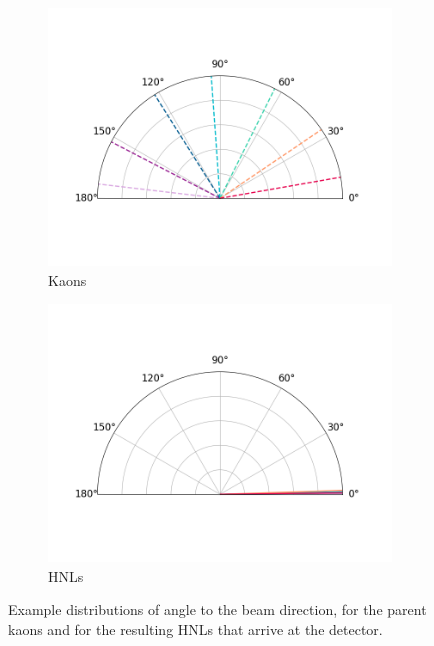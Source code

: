 \begin{figure}[tbp!]
        \centering
        \begin{subfigure}[b]{0.495\textwidth}
            \centering
            \includegraphics[width=\textwidth]{kaon_angle}
            \caption{Kaons}%
            \label{fig:kaon_angle2beam}
        \end{subfigure}
        \hfill
        \begin{subfigure}[b]{0.495\textwidth}  
            \centering 
            \includegraphics[width=\textwidth]{hnl_angle}
            \caption{HNLs}%
            \label{fig:hnl_angle2beam}
        \end{subfigure}
        \caption[kaon_hnl_angle2beam]{Example distributions of angle to the beam direction, for the parent kaons and for the resulting HNLs that arrive at the detector.}
        \label{fig:kaon_hnl_angle2beam}
\end{figure}

